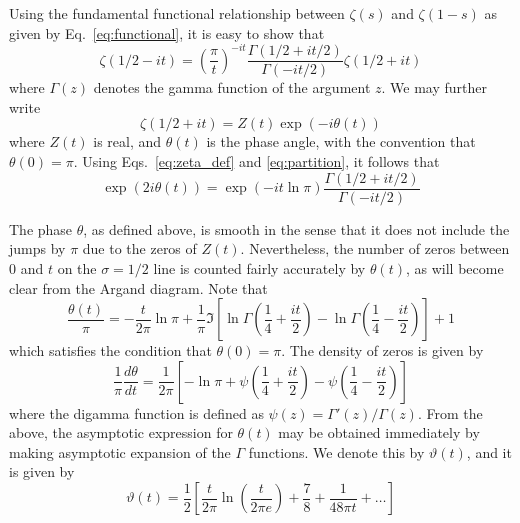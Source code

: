 \documentclass[11pt]{article}
\theoremstyle{plain}
\begin{document}
Using the fundamental functional relationship between $\zeta(s)$ and $\zeta(1 - s)$ as given by Eq.~\eqref{eq:functional}, it is easy to show that
\begin{equation}
\zeta(1/2 - it) = \left(\frac{\pi}{t}\right)^{-it} \frac{\Gamma(1/2 + it/2)}{\Gamma(-it/2)} \zeta(1/2 + it)
\label{eq:symmetry}
\end{equation}
where $\Gamma(z)$ denotes the gamma function of the argument $z$. We may further write
\begin{equation}
\zeta(1/2 + it) = Z(t) \exp(-i\theta(t))
\label{eq:phase_def}
\end{equation}
where $Z(t)$ is real, and $\theta(t)$ is the phase angle, with the convention that $\theta(0) = \pi$. Using Eqs.~\eqref{eq:zeta_def} and \eqref{eq:partition}, it follows that
\begin{equation}
\exp(2i\theta(t)) = \exp(-it \ln \pi) \frac{\Gamma(1/2 + it/2)}{\Gamma(-it/2)}
\label{eq:phase_relation}
\end{equation}

The phase $\theta$, as defined above, is smooth in the sense that it does not include the jumps by $\pi$ due to the zeros of $Z(t)$. Nevertheless, the number of zeros between 0 and $t$ on the $\sigma = 1/2$ line is counted fairly accurately by $\theta(t)$, as will become clear from the Argand diagram. Note that
\begin{equation}
\frac{\theta(t)}{\pi} = -\frac{t}{2\pi} \ln \pi + \frac{1}{\pi} \Im \left[ \ln \Gamma\left(\frac{1}{4} + \frac{it}{2}\right) - \ln \Gamma\left(\frac{1}{4} - \frac{it}{2}\right) \right] + 1
\label{eq:phase_formula}
\end{equation}
which satisfies the condition that $\theta(0) = \pi$. The density of zeros is given by
\begin{equation}
\frac{1}{\pi} \frac{d\theta}{dt} = \frac{1}{2\pi} \left[ -\ln \pi + \psi\left(\frac{1}{4} + \frac{it}{2}\right) - \psi\left(\frac{1}{4} - \frac{it}{2}\right) \right]
\label{eq:zero_density}
\end{equation}
where the digamma function is defined as $\psi(z) = \Gamma'(z)/\Gamma(z)$. From the above, the asymptotic expression for $\theta(t)$ may be obtained immediately by making asymptotic expansion of the $\Gamma$ functions. We denote this by $\vartheta(t)$, and it is given by
\begin{equation}
\vartheta(t) = \frac{1}{2} \left[ \frac{t}{2\pi} \ln\left(\frac{t}{2\pi e}\right) + \frac{7}{8} + \frac{1}{48\pi t} + \ldots \right]
\label{eq:asymptotic_phase}
\end{equation}
\end{document}
